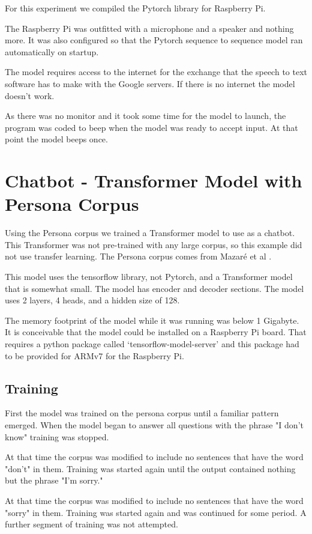 For this experiment we compiled the Pytorch library for Raspberry Pi.

The Raspberry Pi was outfitted with a microphone and a speaker and nothing more. It was also configured so that the Pytorch sequence to sequence model ran automatically on startup.

The model requires access to the internet for the exchange that the speech to text software has to make with the Google servers. If there is no internet the model doesn't work.

As there was no monitor and it took some time for the model to launch, the program was coded to beep when the model was ready to accept input. At that point the model beeps once.

\section{Chatbot - Transformer Model with Persona Corpus}
Using the Persona corpus we trained a Transformer model to use as a chatbot. This Transformer was not pre-trained with any large corpus, so this example did not use transfer learning. The Persona corpus comes from Mazar{\'{e}} et al \cite{DBLP:journals/corr/abs-1809-01984}.

This model uses the tensorflow library, not Pytorch, and a Transformer model that is somewhat small. The model has encoder and decoder sections. The model uses 2 layers, 4 heads, and a hidden size of 128.

The memory footprint of the model while it was running was below 1 Gigabyte. It is conceivable that the model could be installed on a Raspberry Pi board. That requires a python package called `tensorflow-model-server' and this package had to be provided for ARMv7 for the Raspberry Pi. 

\subsection{Training}
First the model was trained on the persona corpus until a familiar pattern emerged. When the model began to answer all questions with the phrase "I don't know" training was stopped. 

At that time the corpus was modified to include no sentences that have the word "don't" in them. Training was started again until the output contained nothing but the phrase "I'm sorry." 

At that time the corpus was modified to include no sentences that have the word "sorry" in them. Training was started again and was continued for some period. A further segment of training was not attempted. 

